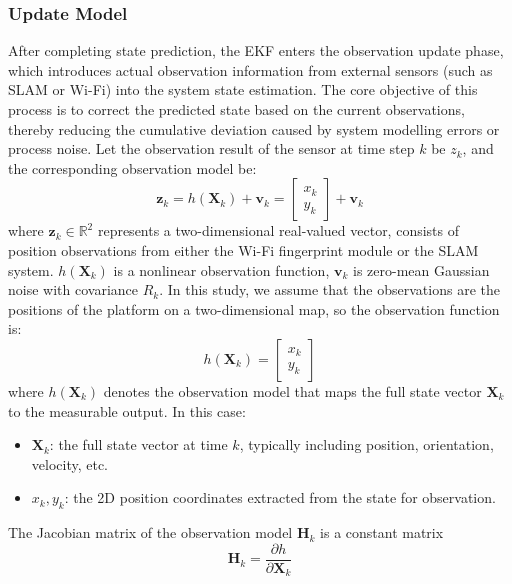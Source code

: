 \documentclass[12pt,a4paper]{article}
\numberwithin{equation}{section}
\begin{document}
\subsubsection{Update Model}
After completing state prediction, the EKF enters the observation update phase, which introduces actual observation information from external sensors (such as SLAM or Wi-Fi) into the system state estimation. The core objective of this process is to correct the predicted state based on the current observations, thereby reducing the cumulative deviation caused by system modelling errors or process noise. Let the observation result of the sensor at time step $k$ be $z_k$, and the corresponding observation model be:
\begin{equation}
\mathbf{z}_k = h(\mathbf{X}_k) + \mathbf{v}_k =
\begin{bmatrix}
x_k \\
y_k
\end{bmatrix} + \mathbf{v}_k
\label{eq:observation_model}
\end{equation}
where \(\mathbf{z}_k \in \mathbb{R}^2\) represents a two-dimensional real-valued vector, consists of position observations from either the Wi-Fi fingerprint module or the SLAM system. $h(\mathbf{X}_k)$ is a nonlinear observation function, $\mathbf{v}_k$ is zero-mean Gaussian noise with covariance $R_k$. In this study, we assume that the observations are the positions of the platform on a two-dimensional map, so the observation function is:
\begin{equation}
h(\mathbf{X}_k) = 
\begin{bmatrix}
x_k \\
y_k
\end{bmatrix}
\end{equation}
\noindent
where $h(\mathbf{X}_k)$ denotes the observation model that maps the full state vector $\mathbf{X}_k$ to the measurable output. In this case:
\begin{itemize}
  \item $\mathbf{X}_k$: the full state vector at time $k$, typically including position, orientation, velocity, etc.
  \item $x_k, y_k$: the 2D position coordinates extracted from the state for observation.
\end{itemize}
The Jacobian matrix of the observation model $\mathbf{H}_k$ is a constant matrix
\begin{equation}
\mathbf{H}_k = \frac{\partial h}{\partial \mathbf{X}_k}
\end{equation}
\end{document}

